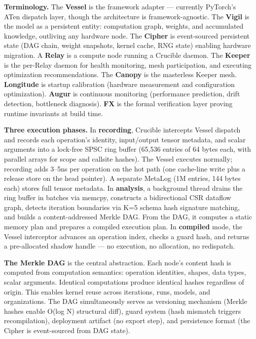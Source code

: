 \textbf{Terminology.} The \textbf{Vessel} is the framework adapter --- currently PyTorch's ATen dispatch layer, though the architecture is framework-agnostic. The \textbf{Vigil} is the model as a persistent entity: computation graph, weights, and accumulated knowledge, outliving any hardware node. The \textbf{Cipher} is event-sourced persistent state (DAG chain, weight snapshots, kernel cache, RNG state) enabling hardware migration. A \textbf{Relay} is a compute node running a Crucible daemon. The \textbf{Keeper} is the per-Relay daemon for health monitoring, mesh participation, and executing optimization recommendations. The \textbf{Canopy} is the masterless Keeper mesh. \textbf{Longitude} is startup calibration (hardware measurement and configuration optimization). \textbf{Augur} is continuous monitoring (performance prediction, drift detection, bottleneck diagnosis). \textbf{FX} is the formal verification layer proving runtime invariants at build time.

\textbf{Three execution phases.} In \textbf{recording}, Crucible intercepts Vessel dispatch and records each operation's identity, input/output tensor metadata, and scalar arguments into a lock-free SPSC ring buffer (65,536 entries of 64 bytes each, with parallel arrays for scope and callsite hashes). The Vessel executes normally; recording adds 3--5ns per operation on the hot path (one cache-line write plus a release store on the head pointer). A separate MetaLog (1M entries, 144 bytes each) stores full tensor metadata. In \textbf{analysis}, a background thread drains the ring buffer in batches via memcpy, constructs a bidirectional CSR dataflow graph, detects iteration boundaries via K=5 schema hash signature matching, and builds a content-addressed Merkle DAG. From the DAG, it computes a static memory plan and prepares a compiled execution plan. In \textbf{compiled} mode, the Vessel interceptor advances an operation index, checks a guard hash, and returns a pre-allocated shadow handle --- no execution, no allocation, no redispatch.

\textbf{The Merkle DAG} is the central abstraction. Each node's content hash is computed from computation semantics: operation identities, shapes, data types, scalar arguments. Identical computations produce identical hashes regardless of origin. This enables kernel reuse across iterations, runs, models, and organizations. The DAG simultaneously serves as versioning mechanism (Merkle hashes enable O(log N) structural diff), guard system (hash mismatch triggers recompilation), deployment artifact (no export step), and persistence format (the Cipher is event-sourced from DAG state).


